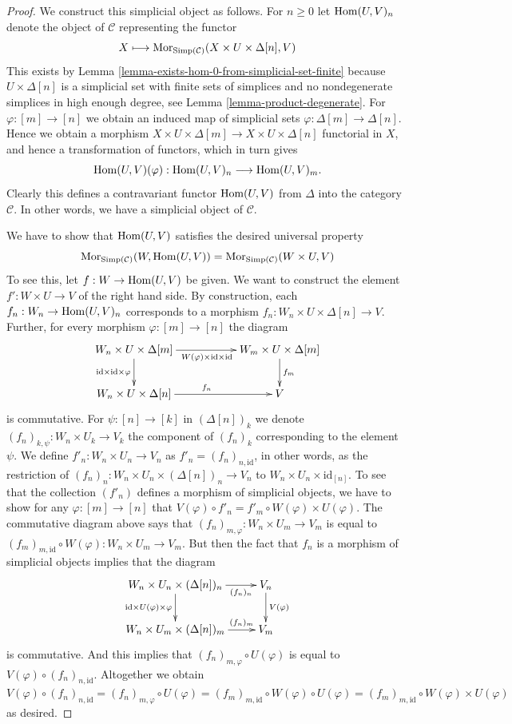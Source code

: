 \begin{proof}
We construct this simplicial object as follows.
For $n \geq 0$ let $\mathop{\mathrm{Hom}}\nolimits(U, V)_n$ denote
the object of $\mathcal{C}$ representing the
functor
$$
X
\longmapsto
\mathop{\mathrm{Mor}}\nolimits_{\text{Simp}(\mathcal{C})}(X \times U \times \Delta[n], V)
$$
This exists by Lemma \ref{lemma-exists-hom-0-from-simplicial-set-finite}
because $U \times \Delta[n]$ is a simplicial set with finite
sets of simplices and no nondegenerate simplices in high enough degree,
see Lemma \ref{lemma-product-degenerate}.
For $\varphi : [m] \to [n]$ we obtain an induced map of simplicial
sets $\varphi : \Delta[m] \to \Delta[n]$. Hence we obtain a morphism
$X \times U \times \Delta[m] \to X \times U \times \Delta[n]$
functorial in $X$, and hence a transformation of functors,
which in turn gives
$$
\mathop{\mathrm{Hom}}\nolimits(U, V)(\varphi) :
\mathop{\mathrm{Hom}}\nolimits(U, V)_n
\longrightarrow
\mathop{\mathrm{Hom}}\nolimits(U, V)_m.
$$
Clearly this defines a contravariant functor
$\mathop{\mathrm{Hom}}\nolimits(U, V)$ from
$\Delta$ into the category $\mathcal{C}$.
In other words, we have a simplicial object of $\mathcal{C}$.

\medskip\noindent
We have to show that $\mathop{\mathrm{Hom}}\nolimits(U, V)$ satisfies the desired
universal property
$$
\mathop{\mathrm{Mor}}\nolimits_{\text{Simp}(\mathcal{C})}(W, \mathop{\mathrm{Hom}}\nolimits(U, V))
=
\mathop{\mathrm{Mor}}\nolimits_{\text{Simp}(\mathcal{C})}(W \times U, V)
$$
To see this, let $f : W \to \mathop{\mathrm{Hom}}\nolimits(U, V)$ be given.
We want to construct the element $f' : W \times U \to V$
of the right hand side.
By construction, each $f_n : W_n \to \mathop{\mathrm{Hom}}\nolimits(U, V)_n$
corresponds to a morphism
$f_n : W_n \times U \times \Delta[n] \to V$. Further,
for every morphism $\varphi : [m] \to [n]$ the
diagram
$$
\xymatrix{
W_n \times U \times \Delta[m]
\ar[rr]_{W(\varphi)\times \text{id} \times \text{id}}
\ar[d]_{\text{id} \times \text{id} \times \varphi} & &
W_m \times U \times \Delta[m] \ar[d]^{f_m} \\
W_n \times U \times \Delta[n] \ar[rr]^{f_n} & & V
}
$$
is commutative. For $\psi : [n] \to [k]$ in $(\Delta[n])_k$
we denote $(f_n)_{k, \psi} : W_n \times U_k \to V_k$
the component of $(f_n)_k$ corresponding to the element
$\psi$. We define $f'_n : W_n \times U_n \to V_n$
as $f'_n = (f_n)_{n, \text{id}}$, in other words, as
the restriction of
$(f_n)_n : W_n \times U_n \times (\Delta[n])_n \to V_n$
to $W_n \times U_n \times \text{id}_{[n]}$.
To see that the collection $(f'_n)$ defines a
morphism of simplicial objects, we have to show
for any $\varphi : [m] \to [n]$ that
$V(\varphi) \circ f'_n =
f'_m \circ W(\varphi) \times U(\varphi)$.
The commutative diagram above says that
$(f_n)_{m, \varphi} : W_n \times U_m \to V_m$
is equal to
$(f_m)_{m, \text{id}} \circ W(\varphi) :
W_n \times U_m \to V_m$.
But then the fact that $f_n$ is a morphism of simplicial
objects implies that the diagram
$$
\xymatrix{
W_n \times U_n \times (\Delta[n])_n
\ar[r]_-{(f_n)_n}
\ar[d]_{\text{id} \times U(\varphi) \times \varphi}
& V_n \ar[d]^{V(\varphi)} \\
W_n \times U_m \times (\Delta[n])_m \ar[r]^-{(f_n)_m} & V_m
}
$$
is commutative. And this implies that
$(f_n)_{m, \varphi} \circ U(\varphi)$ is
equal to $V(\varphi) \circ (f_n)_{n, \text{id}}$.
Altogether we obtain
$
V(\varphi) \circ (f_n)_{n, \text{id}}
=
(f_n)_{m, \varphi} \circ U(\varphi)
=
(f_m)_{m, \text{id}} \circ W(\varphi)\circ U(\varphi)
=
(f_m)_{m, \text{id}} \circ W(\varphi)\times U(\varphi)
$
as desired.


\end{proof}
